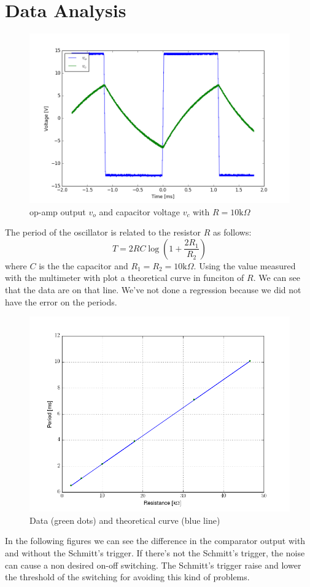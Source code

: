 \section{Data Analysis}
\begin{figure}[H]
\centering
\includegraphics[width=.7\textwidth]{5/10k_plot.png}
\caption{op-amp output $v_o$ and capacitor voltage $v_c$ with $R=10\text{k}\Omega$}
\end{figure}
The period of the oscillator is related to the resistor $R$ as follows:
\[T = 2RC\log \left(1+\frac{2R_1}{R_2}\right)\]
where $C$ is the the capacitor and $R_1=R_2=10\text{k}\Omega$. Using the value measured with the multimeter with plot a theoretical curve in funciton of $R$. We can see that the data are on that line. We've not done a regression because we did not have the error on the periods.
\begin{figure}[H]
\centering
\includegraphics[width=.7\textwidth]{5/fit.png}
\caption{Data (green dots) and theoretical curve (blue line)}
\end{figure}
In the following figures we can see the difference in the comparator output with and without the Schmitt's trigger. If there's not the Schmitt's trigger, the noise can cause a non desired on-off switching. The Schmitt's trigger raise and lower the threshold of the switching for avoiding this kind of problems.
